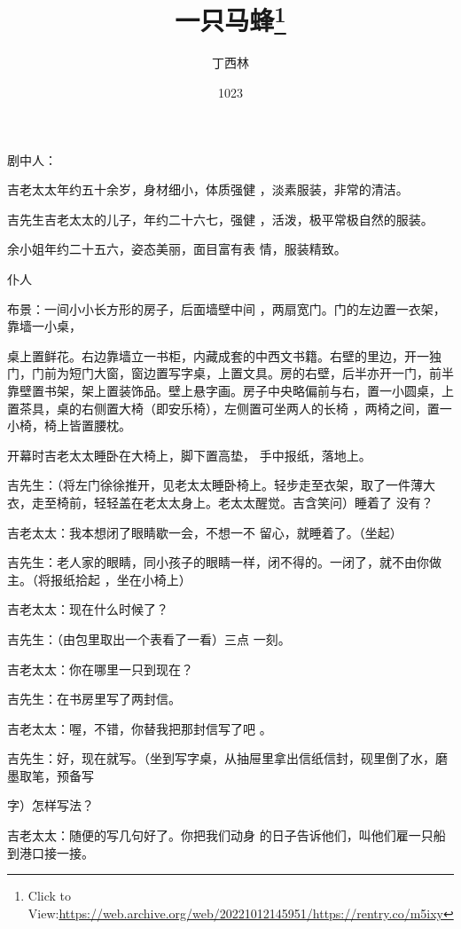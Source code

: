 \documentclass{article}
\title{一只马蜂\footnote{Click to View:\url{https://web.archive.org/web/20221012145951/https://rentry.co/m5ixy}}}
\author{丁西林}
\date{1023}
\begin{document}

\maketitle


\Large


﻿剧中人： 

吉老太太年约五十余岁，身材细小，体质强健
，淡素服装，非常的清洁。 

吉先生吉老太太的儿子，年约二十六七，强健
，活泼，极平常极自然的服装。 

余小姐年约二十五六，姿态美丽，面目富有表
情，服装精致。 


仆人 


 

\newpage

布景：一间小小长方形的房子，后面墙壁中间
，两扇宽门。门的左边置一衣架，靠墙一小桌， 

桌上置鲜花。右边靠墙立一书柜，内藏成套的中西文书籍。右壁的里边，开一独门，门前为短门大窗，窗边置写字桌，上置文具。房的右壁，后半亦开一门，前半靠壁置书架，架上置装饰品。壁上悬字画。房子中央略偏前与右，置一小圆桌，上置茶具，桌的右侧置大椅（即安乐椅），左侧置可坐两人的长椅
，两椅之间，置一小椅，椅上皆置腰枕。 


开幕时吉老太太睡卧在大椅上，脚下置高垫，
手中报纸，落地上。 


吉先生：（将左门徐徐推开，见老太太睡卧椅上。轻步走至衣架，取了一件薄大衣，走至椅前，轻轻盖在老太太身上。老太太醒觉。吉含笑问）睡着了
没有？ 

\newpage

吉老太太：我本想闭了眼睛歇一会，不想一不
留心，就睡着了。（坐起） 

吉先生：老人家的眼睛，同小孩子的眼睛一样，闭不得的。一闭了，就不由你做主。（将报纸拾起
，坐在小椅上） 


吉老太太：现在什么时候了？ 

吉先生：（由包里取出一个表看了一看）三点
一刻。 


吉老太太：你在哪里一只到现在？ 


吉先生：在书房里写了两封信。 

吉老太太：喔，不错，你替我把那封信写了吧
。 

吉先生：好，现在就写。（坐到写字桌，从抽屉里拿出信纸信封，砚里倒了水，磨墨取笔，预备写
\newpage

字）怎样写法？ 

吉老太太：随便的写几句好了。你把我们动身
的日子告诉他们，叫他们雇一只船到港口接一接。 
\end{document}
